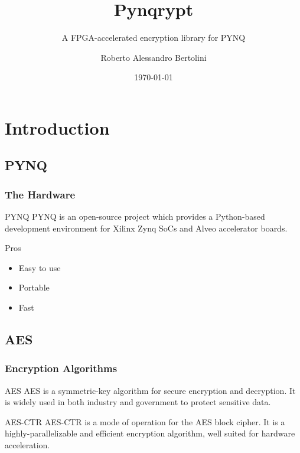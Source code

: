\documentclass{beamer}
\title{Pynqrypt}
\author{Roberto Alessandro Bertolini}
\institute{FPGA101 - Politecnico di Milano}
\date{\today}
\subtitle{A FPGA-accelerated encryption library for PYNQ}
\begin{document}
\begin{frame}
    \titlepage
\end{frame}

\section{Introduction}

\subsection{PYNQ}
\begin{frame}
    \frametitle{The Hardware}

    \begin{block}{PYNQ}
    PYNQ is an open-source project which provides a Python-based development environment for Xilinx Zynq SoCs and Alveo accelerator boards.
    \end{block}

    \begin{exampleblock}{Pros}
        \begin{itemize}
            \item Easy to use
            \item Portable
            \item Fast
        \end{itemize}
    \end{exampleblock}
\end{frame}

\subsection{AES}
\begin{frame}
    \frametitle{Encryption Algorithms}

    \begin{block}{AES}
    AES is a symmetric-key algorithm for secure encryption and decryption. It is widely used in both industry and government to protect sensitive data.
    \end{block}

    \begin{block}{AES-CTR}
    AES-CTR is a mode of operation for the AES block cipher. It is a highly-parallelizable and efficient encryption algorithm, well suited for hardware acceleration.
    \end{block}
\end{frame}
\end{document}
